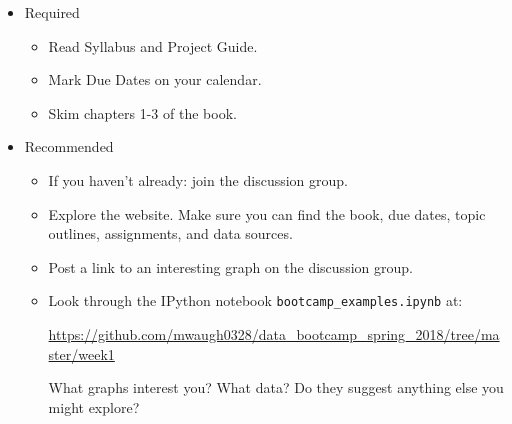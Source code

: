 \begin{itemize}
\item Required
\begin{itemize}
\item Read Syllabus and Project Guide.
\item Mark Due Dates on your calendar.
\item Skim chapters 1-3 of the book.
\end{itemize}
\item Recommended
\begin{itemize}
\item If you haven't already:  join the discussion group.
\item Explore the website.  Make sure you can find the book, due dates,
topic outlines, assignments, and data sources.
\item Post a link to an interesting graph on the discussion group.
\item Look through the IPython notebook \verb|bootcamp_examples.ipynb| at:

\url{https://github.com/mwaugh0328/data_bootcamp_spring_2018/tree/master/week1}
    
What graphs interest you?  What data?
Do they suggest anything else you might explore?
\end{itemize}
\end{itemize}



